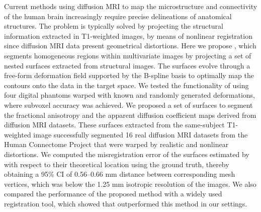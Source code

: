 Current methods using diffusion MRI to map the microstructure and connectivity of the
  human brain increasingly require precise delineations of anatomical structures.
The problem is typically solved by projecting the structural information extracted
  in T1-weighted images, by means of nonlinear registration since diffusion
  MRI data present geometrical distortions.
Here we propose \regseg{}, which segments homogeneous regions within multivariate
  images by projecting a set of nested surfaces extracted from structural images.
The surfaces evolve through a free-form deformation field supported by the B-spline basis
  to optimally map the contours onto the data in the target space.
We tested the functionality of \regseg{} using four digital phantoms warped with known and
  randomly generated deformations, where subvoxel accuracy was achieved.
We proposed a set of surfaces to segment the fractional anisotropy and the apparent diffusion
  coefficient maps derived from diffusion MRI datasets.
These surfaces extracted from the same-subject T1-weighted image successfully segmented 16 real
  diffusion MRI datasets from the Human Connectome Project that were warped by realistic and nonlinear
  distortions.
We computed the misregistration error of the surfaces estimated by \regseg{} with respect
  to their theoretical location using the ground truth, thereby obtaining a 95\% CI of 0.56--0.66 mm
  distance between corresponding mesh vertices, which was below the 1.25 mm isotropic resolution of the images.
We also compared the performance of the proposed method with a widely used registration tool, which showed
  that \regseg{} outperformed this method in our settings.